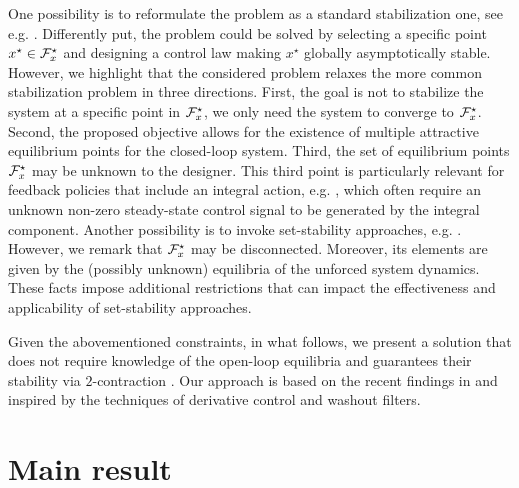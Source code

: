 \documentclass{ifacconf}
\begin{document}
One possibility is to reformulate the problem as a standard stabilization one, see e.g. \citep{isidori2017stabilization}. Differently put, the problem could be solved by selecting a specific point  $x^\star\in{\mathcal{F}}_x^\star$ and designing a control law making $x^\star$ globally asymptotically stable. However, we highlight that the considered problem relaxes the more common stabilization problem in three directions. First, the goal is not to stabilize the system at a specific point in ${\mathcal{F}}_x^\star$, we only need the system to converge to ${\mathcal{F}}_x^\star$. Second, the proposed objective allows for the existence of multiple attractive equilibrium points for the closed-loop system.  Third, the set of equilibrium points ${\mathcal{F}}_x^\star$ may be unknown to the designer. This third point is particularly relevant for feedback policies that include an integral action, e.g. \citep{Astolfi2017,GIACCAGLI2023111106}, which often require an unknown non-zero steady-state control signal to be generated by the integral component.
Another possibility is to invoke set-stability approaches, e.g. \citep{SHIRIAEV20001709}. However, we remark that ${\mathcal{F}}_x^\star$ may be disconnected. Moreover, its elements are given by the (possibly unknown) equilibria of the unforced system dynamics. These facts impose additional restrictions that can impact the effectiveness and applicability of set-stability approaches. 

Given the abovementioned constraints, in what follows, we present a solution that does not require knowledge of the open-loop equilibria and guarantees their stability via $2$-contraction \citep{Michael1995}. Our approach is based on the recent findings in \citep{ cecilia2023generalized, zoboli2024dynamic} and inspired by the techniques of derivative control and washout filters.



\section{Main result}
\end{document}

